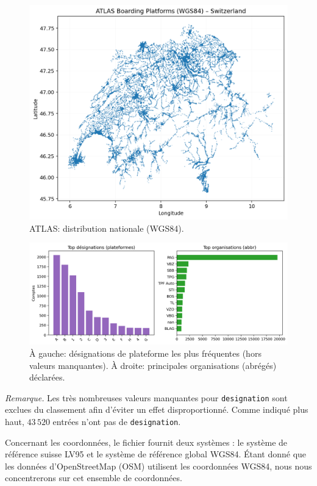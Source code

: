 \begin{figure}[H]
  \centering
  \includegraphics[width=.76\linewidth]{figures/plots/atlas_points_switzerland.png}
  \caption[ATLAS: distribution nationale]{ATLAS: distribution nationale (WGS84).}
  \label{fig:atlas_ch_points}
\end{figure}

\begin{figure}[H]
  \centering
  \includegraphics[width=.85\linewidth]{figures/plots/atlas_designation_operators.png}
  \caption[Désignations et opérateurs ATLAS]{À gauche: désignations de plateforme les plus fréquentes (hors valeurs manquantes). À droite: principales organisations (abrégés) déclarées.}
  \label{fig:atlas_distribs}
\end{figure}

\noindent\textit{Remarque.} Les très nombreuses valeurs manquantes pour \texttt{designation} sont exclues du classement afin d'éviter un effet disproportionné. Comme indiqué plus haut, \(43\,520\) entrées n'ont pas de \texttt{designation}.

Concernant les coordonnées, le fichier fournit deux systèmes : le système de référence suisse LV95 et le système de référence global WGS84. Étant donné que les données d'OpenStreetMap (OSM) utilisent les coordonnées WGS84, nous nous concentrerons sur cet ensemble de coordonnées.

